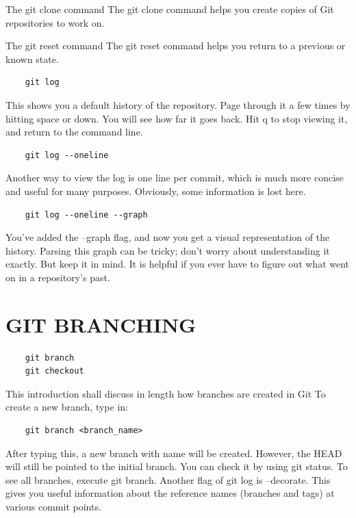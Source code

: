 \documentclass{report}
\begin{document}
The git clone command
The git clone command helps you create copies of Git repositories to work on.

The git reset command
The git reset command helps you return to a previous or known state.

\begin{lstlisting}
    git log
\end{lstlisting}

This shows you a default history of the repository. Page through it a few times by hitting space or down. You will see how far it goes back. Hit q to stop viewing it, and return to the command line.


\begin{lstlisting}
    git log --oneline
\end{lstlisting}
Another way to view the log is one line per commit, which is much more concise and useful for many purposes. Obviously, some information is lost here.

\begin{lstlisting}
    git log --oneline --graph
\end{lstlisting}

You've added the --graph flag, and now you get a visual representation of the history. Parsing this graph can be tricky; don't worry about understanding it exactly. But keep it in mind. It is helpful if you ever have to figure out what went on in a repository's past.

\chapter{GIT BRANCHING}

\begin{lstlisting}
    git branch
    git checkout
\end{lstlisting}

This introduction shall discuss in length how branches are created in Git To create a new branch, type in:

\begin{lstlisting} 
    git branch <branch_name> 
\end{lstlisting} 

After typing this, a new branch with name  will be created. However, the HEAD will still be pointed to the initial branch. You can check it by using git status. To see all branches, execute git branch. Another flag of git log is --decorate. This gives you useful information about the reference names (branches and tags) at various commit points. 
\end{document}
